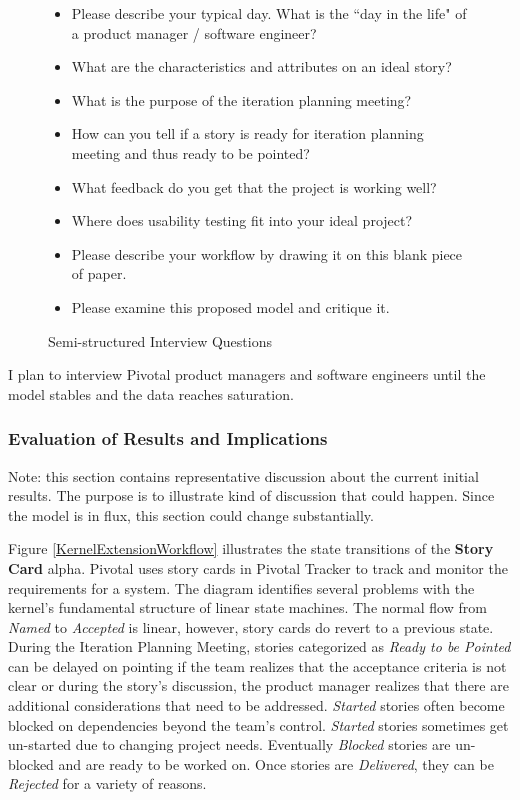 \documentclass[preprint,12pt,3p]{elsarticle}
\begin{document}
\begin{figure}[h]\vspace*{4pt}
\caption{Semi-structured Interview Questions}\vspace*{-6pt}\label{InterviewQuestions}
\begin{itemize}
\item Please describe your typical day. What is the ``day in the life" of a product manager / software engineer?
\item What are the characteristics and attributes on an ideal story?
\item What is the purpose of the iteration planning meeting?
\item How can you tell if a story is ready for iteration planning meeting and thus ready to be pointed?
\item What feedback do you get that the project is working well?
\item Where does usability testing fit into your ideal project?
\item Please describe your workflow by drawing it on this blank piece of paper.
\item Please examine this proposed model and critique it.
\end{itemize}
\end{figure}

I plan to interview Pivotal product managers and software engineers until the model stables and the data reaches saturation.

\subsubsection{Evaluation of Results and Implications}

Note: this section contains representative discussion about the current initial results. The purpose is to illustrate kind of discussion that could happen. Since the model is in flux, this section could change substantially.

Figure \ref{KernelExtensionWorkflow} illustrates the state transitions of the \textbf{Story Card} alpha. Pivotal uses story cards in Pivotal Tracker to track and monitor the requirements for a system. The diagram identifies several problems with the kernel's fundamental structure of linear state machines. The normal flow from \textit{Named} to \textit{Accepted} is linear, however, story cards do revert to a previous state. During the Iteration Planning Meeting, stories categorized as \textit{Ready to be Pointed} can be delayed on pointing if the team realizes that the acceptance criteria is not clear or during the story's discussion, the product manager realizes that there are additional considerations that need to be addressed. \textit{Started} stories often become blocked on dependencies beyond the team's control. \textit{Started} stories sometimes get un-started due to changing project needs. Eventually \textit{Blocked} stories are un-blocked and are ready to be worked on. Once stories are \textit{Delivered}, they can be \textit{Rejected} for a variety of reasons.
\end{document}

